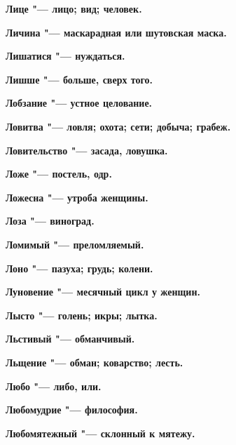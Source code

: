 \begin{multicols}{2}
\bfseries Лице\normalfont{} "--- лицо; вид; человек. 




\bfseries Личина\normalfont{} "--- маскарадная или шутовская маска. 




\bfseries Лишатися\normalfont{} "--- нуждаться. 




\bfseries Лишше\normalfont{} "--- больше, сверх того. 




\bfseries Лобзание\normalfont{} "--- устное целование. 




\bfseries Ловитва\normalfont{} "--- ловля; охота; сети; добыча; грабеж. 




\bfseries Ловительство\normalfont{} "--- засада, ловушка. 




\bfseries Ложе\normalfont{} "--- постель, одр. 




\bfseries Ложесна\normalfont{} "--- утроба женщины. 




\bfseries Лоза\normalfont{} "--- виноград. 




\bfseries Ломимый\normalfont{} "--- преломляемый. 




\bfseries Лоно\normalfont{} "--- пазуха; грудь; колени. 




\bfseries Луновение\normalfont{} "--- месячный цикл у женщин. 




\bfseries Лысто\normalfont{} "--- голень; икры; лытка. 




\bfseries Льстивый\normalfont{} "--- обманчивый. 




\bfseries Льщение\normalfont{} "--- обман; коварство; лесть. 




\bfseries Любо\normalfont{} "--- либо, или. 




\bfseries Любомудрие\normalfont{} "--- философия. 




\bfseries Любомятежный\normalfont{} "--- склонный к мятежу. 





\end{multicols}
